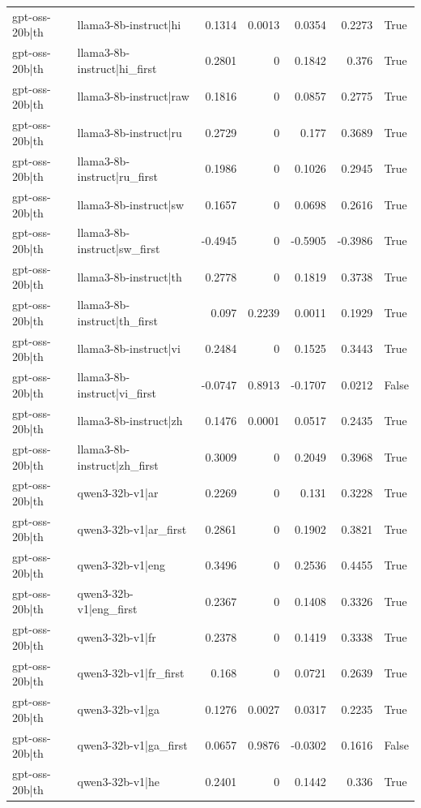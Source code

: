 \begin{table}
\begin{tabular}{l l r r r r l}
gpt-oss-20b|th & llama3-8b-instruct|hi & 0.1314 & 0.0013 & 0.0354 & 0.2273 & True \\
gpt-oss-20b|th & llama3-8b-instruct|hi_first & 0.2801 & 0 & 0.1842 & 0.376 & True \\
gpt-oss-20b|th & llama3-8b-instruct|raw & 0.1816 & 0 & 0.0857 & 0.2775 & True \\
gpt-oss-20b|th & llama3-8b-instruct|ru & 0.2729 & 0 & 0.177 & 0.3689 & True \\
gpt-oss-20b|th & llama3-8b-instruct|ru_first & 0.1986 & 0 & 0.1026 & 0.2945 & True \\
gpt-oss-20b|th & llama3-8b-instruct|sw & 0.1657 & 0 & 0.0698 & 0.2616 & True \\
gpt-oss-20b|th & llama3-8b-instruct|sw_first & -0.4945 & 0 & -0.5905 & -0.3986 & True \\
gpt-oss-20b|th & llama3-8b-instruct|th & 0.2778 & 0 & 0.1819 & 0.3738 & True \\
gpt-oss-20b|th & llama3-8b-instruct|th_first & 0.097 & 0.2239 & 0.0011 & 0.1929 & True \\
gpt-oss-20b|th & llama3-8b-instruct|vi & 0.2484 & 0 & 0.1525 & 0.3443 & True \\
gpt-oss-20b|th & llama3-8b-instruct|vi_first & -0.0747 & 0.8913 & -0.1707 & 0.0212 & False \\
gpt-oss-20b|th & llama3-8b-instruct|zh & 0.1476 & 0.0001 & 0.0517 & 0.2435 & True \\
gpt-oss-20b|th & llama3-8b-instruct|zh_first & 0.3009 & 0 & 0.2049 & 0.3968 & True \\
gpt-oss-20b|th & qwen3-32b-v1|ar & 0.2269 & 0 & 0.131 & 0.3228 & True \\
gpt-oss-20b|th & qwen3-32b-v1|ar_first & 0.2861 & 0 & 0.1902 & 0.3821 & True \\
gpt-oss-20b|th & qwen3-32b-v1|eng & 0.3496 & 0 & 0.2536 & 0.4455 & True \\
gpt-oss-20b|th & qwen3-32b-v1|eng_first & 0.2367 & 0 & 0.1408 & 0.3326 & True \\
gpt-oss-20b|th & qwen3-32b-v1|fr & 0.2378 & 0 & 0.1419 & 0.3338 & True \\
gpt-oss-20b|th & qwen3-32b-v1|fr_first & 0.168 & 0 & 0.0721 & 0.2639 & True \\
gpt-oss-20b|th & qwen3-32b-v1|ga & 0.1276 & 0.0027 & 0.0317 & 0.2235 & True \\
gpt-oss-20b|th & qwen3-32b-v1|ga_first & 0.0657 & 0.9876 & -0.0302 & 0.1616 & False \\
gpt-oss-20b|th & qwen3-32b-v1|he & 0.2401 & 0 & 0.1442 & 0.336 & True \\

\end{tabular}
\end{table}

